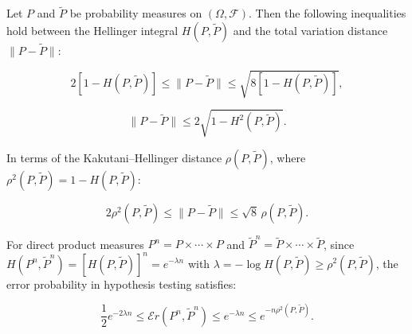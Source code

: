Let $P$ and $\tilde{P}$ be probability measures on $(\Omega, \mathcal{F})$. Then the following inequalities hold between the Hellinger integral $H(P, \tilde{P})$ and the total variation distance $\|P - \tilde{P}\|$:

$$2\left[1 - H(P, \tilde{P})\right] \leq \|P - \tilde{P}\| \leq \sqrt{8\left[1 - H(P, \tilde{P})\right]},$$

$$\|P - \tilde{P}\| \leq 2\sqrt{1 - H^2(P, \tilde{P})}.$$

In terms of the Kakutani--Hellinger distance $\rho(P, \tilde{P})$, where $\rho^2(P, \tilde{P}) = 1 - H(P, \tilde{P})$:

$$2\rho^2(P, \tilde{P}) \leq \|P - \tilde{P}\| \leq \sqrt{8}\,\rho(P, \tilde{P}).$$

For direct product measures $P^n = P \times \cdots \times P$ and $\tilde{P}^n = \tilde{P} \times \cdots \times \tilde{P}$, since $H(P^n, \tilde{P}^n) = [H(P, \tilde{P})]^n = e^{-\lambda n}$ with $\lambda = -\log H(P, \tilde{P}) \geq \rho^2(P, \tilde{P})$, the error probability in hypothesis testing satisfies:

$$\frac{1}{2} e^{-2\lambda n} \leq \mathcal{E}r(P^n, \tilde{P}^n) \leq e^{-\lambda n} \leq e^{-n\rho^2(P, \tilde{P})}.$$
